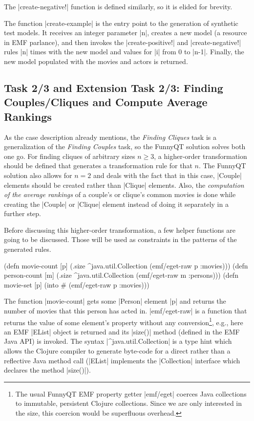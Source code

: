 \documentclass[submission]{eptcs}
\newcommand{\code}{\clojureinline}
\begin{document}
The \code|create-negative!| function is defined similarly, so it is elided for
brevity.

The function \code|create-example| is the entry point to the generation of
synthetic test models.  It receives an integer parameter \code|n|, creates a
new model (a resource in EMF parlance), and then invokes the
\code|create-positive!| and \code|create-negative!| rules \code|n| times with
the new model and values for \code|i| from 0 to \code|n-1|.  Finally, the new
model populated with the movies and actors is returned.


\subsection{Task 2/3 and Extension Task 2/3: Finding Couples/Cliques and
  Compute Average Rankings}
\label{sec:task-2:finding-groups}

As the case description already mentions, the \emph{Finding Cliques} task is a
generalization of the \emph{Finding Couples} task, so the FunnyQT solution
solves both one go.  For finding cliques of arbitrary sizes \(n \geq 3\),
a higher-order transformation should be defined that generates a transformation
rule for that \(n\).
The FunnyQT solution also allows for \(n = 2\)
and deals with the fact that in this case, \code|Couple| elements should be
created rather than \code|Clique| elements.  Also, the \emph{computation of the
  average rankings} of a couple's or clique's common movies is done while
creating the \code|Couple| or \code|Clique| element instead of doing it
separately in a further step.

Before discussing this higher-order transformation, a few helper functions are
going to be discussed.  Those will be used as constraints in the patterns of
the generated rules.

\begin{clojurecode}
(defn movie-count [p]
  (.size ^java.util.Collection (emf/eget-raw p :movies)))
(defn person-count [m]
  (.size ^java.util.Collection (emf/eget-raw m :persons)))
(defn movie-set [p]
  (into #{} (emf/eget-raw p :movies)))
\end{clojurecode}

The function \code|movie-count| gets some \code|Person| element \code|p| and
returns the number of movies that this person has acted in.
\code|emf/eget-raw| is a function that returns the value of some element's
property without any conversion\footnote{The usual FunnyQT EMF property getter
  \code|emf/eget| coerces Java collections to immutable, persistent Clojure
  collections.  Since we are only interested in the size, this coercion would
  be superfluous overhead.}, e.g., here an EMF \code|EList| object is returned
and its \code|size()| method (defined in the EMF Java API) is invoked.  The
syntax \code|^java.util.Collection| is a type hint which allows the Clojure
compiler to generate byte-code for a direct rather than a reflective Java
method call (\code|EList| implements the \code|Collection| interface which
declares the method \code|size()|).
\end{document}

